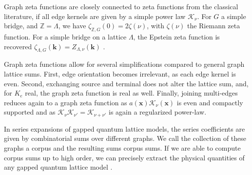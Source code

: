 \documentclass[]{amsart}
\numberwithin{mythm}{section}
\begin{document}
Graph zeta functions are closely connected to zeta functions from the classical literature, if all edge kernels are given by a simple power law $\mathcal K_\nu$. For $G$ a simple bridge, and $\mathds Z=\Lambda$, we have $\zeta_{\mathds Z,G}(0)=2\zeta(\nu)$, with $\zeta(\nu)$ the Riemann zeta function. For a simple bridge on a lattice $\Lambda$, the Epstein zeta function is recovered $\zeta_{\Lambda,G}(\bm k)=Z_{\Lambda,\nu}(\bm k)$ \cite{epstein1903theorieI,epstein1903theorieII}.

\begin{remark}
Graph zeta functions allow for several simplifications compared to general graph lattice sums. First, edge orientation becomes irrelevant, as each edge kernel is even. Second, exchanging source and terminal does not alter the lattice sum, and, for $K_e$ real, the graph zeta function is real as well. Finally, joining multi-edges reduces again to a graph zeta function as $a(\bm x) \mathcal K_\nu(\bm x)$ is even and compactly supported and as  $\mathcal K_{\nu} \mathcal K_{\nu'}=\mathcal K_{\nu+\nu'}$ is again a regularized power-law.
\end{remark}

In series expansions of gapped quantum lattice models, the series coefficients are given by combinatorial sums over different graphs. We call the collection of these graphs a corpus and the resulting sums corpus sums. If we are able to compute corpus sums up to high order, we can precisely extract the physical quantities of any gapped quantum lattice model \cite{adelhardt2024monte}.
\end{document}
